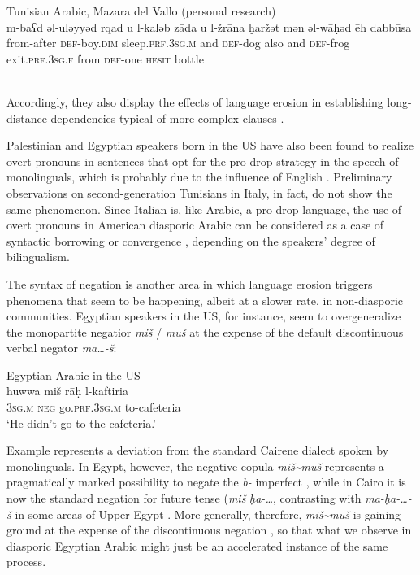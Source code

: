 \documentclass[output=paper]{langsci/langscibook}
\begin{document}
\ea
{Tunisian Arabic, Mazara del Vallo (personal research)}\\
\gll m-baʕd əl-uləyyəd rqad u l-kaləb zāda u l-žrāna ḫaržət mən əl-wāḥəd ēh dabbūsa\\
 from-after \textsc{def}-boy.\textsc{dim} sleep\textsc{.prf.3sg.m} and \textsc{def-}dog also and \textsc{def-}frog exit\textsc{.prf.3sg.f} from \textsc{def-}one \textsc{hesit} bottle\\
\\
\z

Accordingly, they also display the effects of language erosion in establishing long-distance dependencies typical of more complex clauses \citep[305]{Albirini2016}.

Palestinian and Egyptian speakers born in the US have also been found to realize overt pronouns in sentences that opt for the pro-drop strategy in the speech of monolinguals, which is probably due to the influence of English \citep[283]{AlbiriniSaadah2014}. Preliminary observations on second-generation Tunisians in Italy, in fact, do not show the same phenomenon. Since Italian is, like Arabic, a pro-drop language, the use of overt pronouns in American diasporic Arabic can be considered as a case of syntactic borrowing or convergence \citep{Lucas2015}, depending on the speakers’ degree of bilingualism.

The syntax of negation is another area in which language erosion triggers phenomena that seem to be happening, albeit at a slower rate, in non-diasporic communities. Egyptian speakers in the US, for instance, seem to overgeneralize the monopartite negatior \textit{miš} / \textit{muš} at the expense of the default discontinuous verbal negator \textit{ma…-š}: 

\ea\label{ex:key:egy}
{Egyptian Arabic in the US \citep[482]{AlbiriniBenmamoun2015}}\\
\gll huwwa miš rāḥ l-kaftiria\\
     \textsc{3sg.m} \textsc{neg} go.\textsc{prf.3sg.m} to-cafeteria\\
\glt `He didn’t go to the cafeteria.'
\z

Example  represents a deviation from the standard Cairene dialect spoken by monolinguals. In Egypt, however, the negative copula \textit{miš{\textasciitilde}muš} represents a pragmatically marked possibility to negate the \textit{b-} imperfect \citep[302]{Brustad2000}, while in Cairo it is now the standard negation for future tense (\textit{miš} \textit{ḥa-…}, contrasting with \textit{ma-ḥa-…-š} in some areas of Upper Egypt \citep[285]{Brustad2000}. More generally, therefore,  \textit{miš{\textasciitilde}muš} is gaining ground at the expense of the discontinuous negation \citep[285]{Brustad2000}, so that what we observe in diasporic Egyptian Arabic might just be an accelerated instance of the same process.
\end{document}
